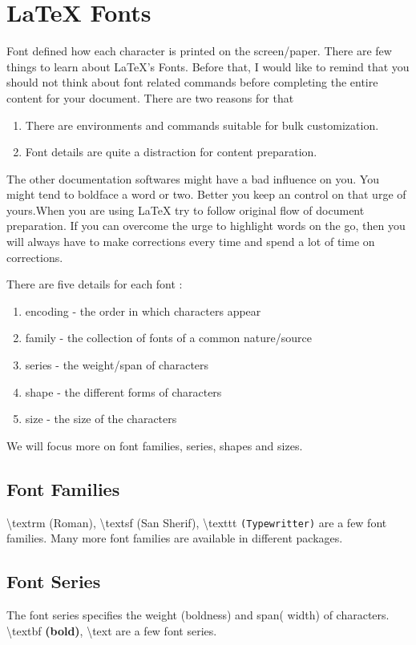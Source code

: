 \documentclass{article}
\begin{document}
\section{\LaTeX{} Fonts}
Font defined how each character is printed on the screen/paper. There are few things to learn about \LaTeX{}'s Fonts. Before that, I would like to remind that you should not think about font related commands before completing the entire content for your document. There are two reasons for that
\begin{enumerate}
	\item There are environments and commands suitable for bulk customization.
	\item Font details are quite a distraction for content preparation.
\end{enumerate}
The other documentation softwares might have a bad influence on you. You might tend to boldface a word or two. Better you keep an control on that urge of yours.When you are using \LaTeX{} try to follow original flow of document preparation. If you can overcome the urge to highlight words on the go, then you will always have to make corrections every time and spend a lot of time on corrections.

There are five details for each font :
\begin{enumerate}
	\item encoding - the order in which characters appear
	\item family - the collection of fonts of a common nature/source
	\item series - the weight/span of characters
	\item shape - the different forms of characters
	\item size - the size of the characters
\end{enumerate}

We will focus more on font families, series, shapes and sizes.
\subsection{Font Families}
\textbackslash textrm \textrm{(Roman)}, \textbackslash textsf \textsf{(San Sherif)}, \textbackslash texttt \texttt{(Typewritter)} are a few font families. Many more font families are available in different packages.

\subsection{Font Series}
The font series specifies the weight (boldness) and span( width) of characters. \textbackslash textbf \textbf{(bold)}, \textbackslash text are a few font series.
\end{document}
